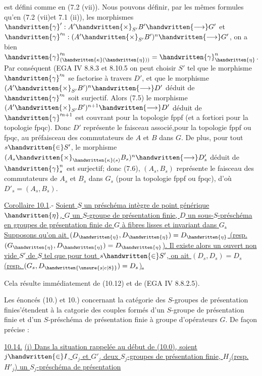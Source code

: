 est défini comme en (7.2 (vii)). Nous pouvons définir, par les mêmes formules qu'en (7.2 (vii)et 7.1 (ii)), les morphismes $\handwritten{\gamma}':A'\handwritten{\times}_{S'}B'\handwritten{\longrightarrow}G'$ et $\handwritten{\gamma}'^n:(A'\handwritten{\times}_{S'}B')^n\handwritten{\longrightarrow}G'$, on a bien $\handwritten{\gamma}'^n_{(\handwritten{\kappa}(\handwritten{\eta}))}=\handwritten{\gamma}^n_{\handwritten{\eta}}$. Par conséquent (EGA IV 8.8.3 et 8.10.5\deleted{)}\handwritten{,} on peut choisir $S'$ tel que le morphisme $\handwritten{\gamma}'^n$ se factorise à travers $D'$, et que le morphisme $(A'\handwritten{\times}_{S'}B')^n\handwritten{\longrightarrow}D'$ déduit de $\handwritten{\gamma}'^n$ soit surjectif. Alors (7.5) le morphisme $(A'\handwritten{\times}_{S'}B')^{n+1}\handwritten{\longrightarrow}D'$ déduit de $\handwritten{\gamma}'^{n+1}$ est couvrant pour la topologie fppf (et a fortiori pour la topologie fpqc). Donc $D'$ représente le faisceau associé,pour la topologie fppf ou fpqc, au préfaisceau des commutateurs de $A$ et $B$ dans $G$. De plus, pour tout $s\handwritten{\in}S'$, le morphisme $(A_s\handwritten{\times}_{\handwritten{\kappa}(s)}B_s)^n\handwritten{\longrightarrow}D'_s$ déduit de $\handwritten{\gamma}^n_s$ est surjectif; donc (7.6), $(A_s,B_s)$ représente le faisceau des commutateurs de $A_s$ et $B_s$ dans $G_s$ (pour la topologie fppf ou fpqc), d'où $D'_s=(A_s,B_s)$.

\uline{Corollaire 10.1}.- \uline{Soient $S$ un préschéma intègre de point générique $\handwritten{\eta}$, $G$ un $S$-groupe de présentation finie, $D$ un sous-$S$-préschéma en groupes de présentation finie de $G$ à fibres lisses et invariant dans $G$. Supposons qu'on ait $(D_{\handwritten{\eta}},D_{\handwritten{\eta}})=D_{\handwritten{\eta}}$ (resp. $(G_{\handwritten{\eta}},D_{\handwritten{\eta}})=D_{\handwritten{\eta}}$). Il existe alors un ouvert non vide $S'$ de $S$ tel que pour tout $s\handwritten{\in}S'$, on ait $(D_s,D_s)=D_s$ (resp. $(G_s,D_{\handwritten{\unsure{s|e|8}}})=D_s$).}

Cela résulte immédiatement de (10.12) et de (EGA IV 8.8.2.5).

Les énoncés (10.) et \inserted{\handwritten{(}}10.) concernant la catégorie des $S$-groupes de présentation finie\handwritten{[}s'étendent à la catgorie des couples formés d'un $S$-groupe de présentation finie et d'un  $S$-préschéma de présentation finie à groupe d'opérateurs $G$. De façon précise :

\uline{10.14.}  \uline{(i) Dans la situation rappelée au début de (10.0), soient $j\handwritten{\in}I$, $G_j$ et $G'_j$ deux $S_j$-groupes de présentation finie, $H_j$(resp. $H'_j$) un $S_j$-préschéma de présentation}

